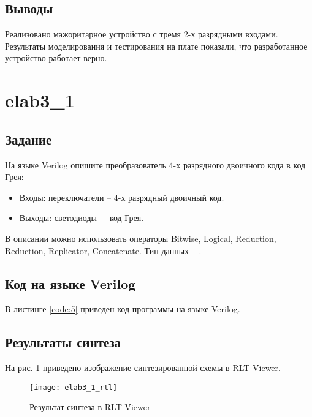 \subsection{Выводы}

Реализовано мажоритарное устройство с тремя 2-х разрядными входами. Результаты моделирования и тестирования на плате показали, что разработанное устройство работает верно.

\section{elab3\_1}

\subsection{Задание}

На языке Verilog опишите преобразователь 4-х разрядного двоичного кода в код Грея:
\begin{itemize}
	\item Входы: переключатели  -- 4-х разрядный двоичный код.
	\item Выходы: светодиоды  –- код Грея.
\end{itemize}

В описании можно использовать операторы Bitwise, Logical, Reduction, Reduction, Replicator, Concatenate. Тип данных -- .

\subsection{Код на языке Verilog}

В листинге \ref{code:5} приведен код программы на языке Verilog.



\subsection{Результаты синтеза}

На рис. \ref{fig:elab3_1_rtl} приведено изображение синтезированной схемы в RLT Viewer.

\begin{figure}[H]
\begin{center}
	\texttt{[image: elab3\_1\_rtl]}
	\caption{Результат синтеза в RLT Viewer}
	\label{fig:elab3_1_rtl}
\end{center}
\end{figure}

